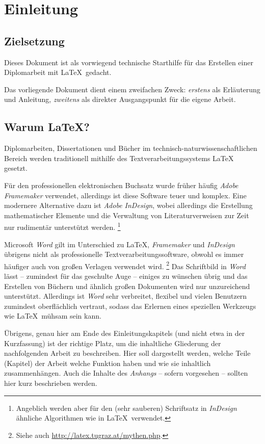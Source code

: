 \chapter{Einleitung}
\label{cha:sb_Einleitung}

\section{Zielsetzung}
Dieses Dokument ist als vorwiegend technische Starthilfe für das
Erstellen einer Diplomarbeit mit \LaTeX\ gedacht.

Das vorliegende Dokument dient einem zweifachen Zweck: 
\emph{erstens} als Erläuterung und Anleitung, \emph{zweitens} als
direkter Ausgangspunkt für die eigene Arbeit.


\section{Warum {\LaTeX}?}

Diplomarbeiten, Dissertationen und Bücher im
technisch-natur\-wissen\-schaft\-lichen Bereich werden
traditionell mithilfe des Textverarbeitungssystems \LaTeX\ 
\cite{Lamport94,Lamport95} gesetzt.

Für den professionellen elektronischen Buchsatz wurde früher
häufig \emph{Adobe Framemaker} verwendet, allerdings ist diese
Software teuer und komplex. Eine modernere Alternative dazu ist
\emph{Adobe InDesign}, wobei allerdings die Erstellung
mathematischer Elemente und die Verwaltung von Literaturverweisen
zur Zeit nur rudimentär unterstützt werden.%
\footnote{Angeblich werden aber für den (sehr sauberen) Schriftsatz 
in \emph{InDesign} ähnliche Algorithmen wie in \LaTeX\ verwendet.}

Microsoft \emph{Word} gilt im Unterschied zu \LaTeX, 
\emph{Framemaker} und \emph{InDesign} übrigens nicht als professionelle
Textverarbeitungssoftware, obwohl es immer häufiger auch von
großen Verlagen verwendet wird.%
\footnote{Siehe auch \url{http://latex.tugraz.at/mythen.php}.}
Das Schriftbild in \emph{Word}
lässt -- zumindest für das geschulte Auge -- einiges zu wünschen
übrig und das Erstellen von Büchern und ähnlich großen Dokumenten
wird nur unzureichend unterstützt. Allerdings ist \emph{Word} sehr
verbreitet, flexibel und vielen Benutzern zumindest oberflächlich
vertraut, sodass das Erlernen eines speziellen Werkzeugs wie
\LaTeX\ mühsam sein kann.

Übrigens, genau hier am Ende des Einleitungskapitels (und nicht
etwa in der Kurzfassung) ist der richtige Platz, um die
inhaltliche Gliederung der nachfolgenden Arbeit zu beschreiben.
Hier soll dargestellt werden, welche Teile (Kapitel) der Arbeit
welche Funktion haben und wie sie inhaltlich zusammenhängen. Auch
die Inhalte des \emph{Anhangs} -- sofern vorgesehen -- sollten hier
kurz beschrieben werden.

